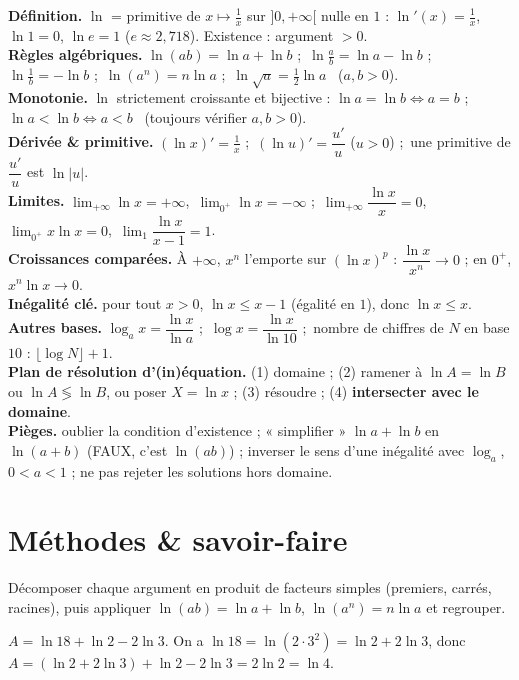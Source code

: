 \begin{synthese}
\textbf{Définition.} $\ln$ = primitive de $x\mapsto\frac1x$ sur $]0,+\infty[$ nulle en $1$ :
$\ln'(x)=\frac1x$, $\ln 1=0$, $\ln e=1$ ($e\approx2{,}718$). Existence : argument $>0$.\\[4pt]
\textbf{Règles algébriques.} $\ln(ab)=\ln a+\ln b$ ;\ $\ln\frac ab=\ln a-\ln b$ ;\
$\ln\frac1b=-\ln b$ ;\ $\ln(a^n)=n\ln a$ ;\ $\ln\sqrt a=\frac12\ln a$ \ ($a,b>0$).\\[4pt]
\textbf{Monotonie.} $\ln$ strictement croissante et bijective : $\ln a=\ln b\iff a=b$ ;\
$\ln a<\ln b\iff a<b$ \ (toujours vérifier $a,b>0$).\\[4pt]
\textbf{Dérivée \& primitive.} $(\ln x)'=\frac1x$ ;\ $(\ln u)'=\dfrac{u'}{u}$ ($u>0$) ;\
une primitive de $\dfrac{u'}{u}$ est $\ln|u|$.\\[4pt]
\textbf{Limites.} $\lim_{+\infty}\ln x=+\infty$,\ $\lim_{0^+}\ln x=-\infty$ ;\
$\lim_{+\infty}\dfrac{\ln x}{x}=0$,\ $\lim_{0^+}x\ln x=0$,\ $\lim_{1}\dfrac{\ln x}{x-1}=1$.\\[4pt]
\textbf{Croissances comparées.} À $+\infty$, $x^n$ l'emporte sur $(\ln x)^p$ :
$\dfrac{\ln x}{x^n}\to0$ ; en $0^+$, $x^n\ln x\to0$.\\[4pt]
\textbf{Inégalité clé.} pour tout $x>0$, $\ln x\le x-1$ (égalité en $1$), donc $\ln x\le x$.\\[4pt]
\textbf{Autres bases.} $\log_a x=\dfrac{\ln x}{\ln a}$ ;\ $\log x=\dfrac{\ln x}{\ln 10}$ ;\
nombre de chiffres de $N$ en base $10$ : $\lfloor\log N\rfloor+1$.\\[4pt]
\textbf{Plan de résolution d'(in)équation.} (1) domaine ; (2) ramener à $\ln A=\ln B$ ou
$\ln A\lessgtr\ln B$, ou poser $X=\ln x$ ; (3) résoudre ; (4) \textbf{intersecter avec le
domaine}.\\[4pt]
\textbf{Pièges.} oublier la condition d'existence ; « simplifier » $\ln a+\ln b$ en
$\ln(a+b)$ (FAUX, c'est $\ln(ab)$) ; inverser le sens d'une inégalité avec $\log_a$,
$0<a<1$ ; ne pas rejeter les solutions hors domaine.
\end{synthese}

\section{Méthodes \& savoir-faire}

Décomposer chaque argument en produit de facteurs simples (premiers, carrés, racines),
puis appliquer $\ln(ab)=\ln a+\ln b$, $\ln(a^n)=n\ln a$ et regrouper.
\begin{exemple}
$A=\ln 18+\ln 2-2\ln 3$. On a $\ln 18=\ln(2\cdot3^2)=\ln 2+2\ln 3$, donc
$A=(\ln 2+2\ln 3)+\ln 2-2\ln 3=2\ln 2=\ln 4$.
\end{exemple}

